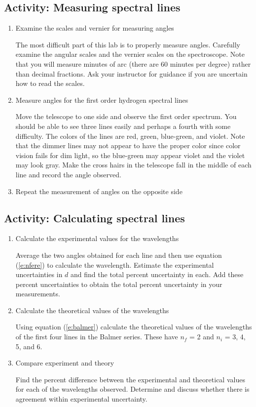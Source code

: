 \subsection{Activity: Measuring spectral lines}
\begin{enumerate}
	\item Examine the scales and vernier for measuring angles
	
	The most difficult part of this lab is to properly measure angles.  Carefully examine the angular scales and the vernier scales on the spectroscope.  Note that you will measure minutes of arc (there are 60 minutes per degree) rather than decimal fractions.  Ask your instructor for guidance if you are uncertain how to read the scales.
	\item Measure angles for the first order hydrogen spectral lines
	
	Move the telescope to one side and observe the first order spectrum.  You should be able to see three lines easily and perhaps a fourth with some difficulty.  The colors of the lines are red, green, blue-green, and violet.  Note that the dimmer lines may not appear to have the proper color since color vision fails for dim light, so the blue-green may appear violet and the violet may look gray.  Make the cross hairs in the telescope fall in the middle of each line and record the angle observed.
	\item Repeat the measurement of angles on the opposite side
\end{enumerate}
	
\subsection{Activity: Calculating spectral lines}
\begin{enumerate}
	\item Calculate the experimental values for the wavelengths
	
	Average the two angles obtained for each line and then use equation (\ref{e:nfere}) to calculate the wavelength.  Estimate the experimental uncertainties in $d$ and find the total percent uncertainty in each.  Add these percent uncertainties to obtain the total percent uncertainty in your measurements.
	\item Calculate the theoretical values of the wavelengths
	
	Using equation (\ref{e:balmer}) calculate the theoretical values of the wavelengths of the first four lines in the Balmer series.  These have $n_f$ = 2 and $n_i$ = 3, 4, 5, and 6.
	\item Compare experiment and theory
	
	Find the percent difference between the experimental and theoretical values for each of the wavelengths observed. Determine and discuss whether there is agreement within experimental uncertainty. 
\end{enumerate}

